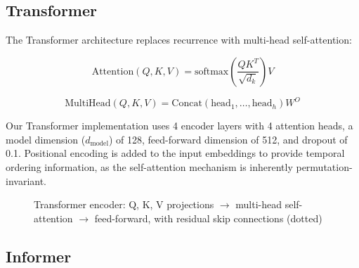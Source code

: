 \subsection{Transformer}

The Transformer architecture replaces recurrence with multi-head self-attention:

\begin{equation}
    \text{Attention}(Q, K, V) = \text{softmax}\left(\frac{QK^T}{\sqrt{d_k}}\right) V
\end{equation}

\begin{equation}
    \text{MultiHead}(Q, K, V) = \text{Concat}(\text{head}_1, \ldots, \text{head}_h) W^O
\end{equation}

Our Transformer implementation uses 4 encoder layers with 4 attention heads, a model dimension ($d_{\text{model}}$) of 128, feed-forward dimension of 512, and dropout of 0.1. Positional encoding is added to the input embeddings to provide temporal ordering information, as the self-attention mechanism is inherently permutation-invariant.

\begin{figure}[H]
\centering
{}
\caption{Transformer encoder: Q, K, V projections $\rightarrow$ multi-head self-attention $\rightarrow$ feed-forward, with residual skip connections (dotted)}
\label{fig:transformer_arch}
\end{figure}

\subsection{Informer}

